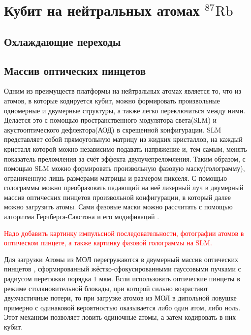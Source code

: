 \section{Кубит на нейтральных атомах $^{87}\text{Rb}$}
\label{sec:chapter_2}

\subsection{Охлаждающие переходы}


\subsection{Массив оптических пинцетов}

Одним из преимуществ платформы на нейтральных атомах является то, что из атомов, в которые кодируется кубит, можно формировать произвольные одномерные и двумерные структуры, а также легко переключаться между ними. Делается это с помощью пространственного модулятора света(SLM) и акустооптического дефлектора(АОД) в скрещенной конфигурации. SLM представляет собой прямоугольную матрицу из жидких кристаллов, на каждый кристалл которой можно независимо подавать напряжение и, тем самым, менять показатель преломления за счёт эффекта двулучепреломления. Таким образом, с помощью SLM можно формировать произвольную фазовую маску(голограмму), ограниченную лишь размерами матрицы и размером пикселя. С помощью голограммы можно преобразовать падающий на неё лазерный луч в двумерный массив оптических пинцетов произвольной конфигурации, в который далее можно загрузить атомы. Сами фазовые маски можно рассчитать с помощью алгоритма Герчберга-Сакстона \cite{Gerchberg1972APA} и его модификаций \cite{robust_masks,Zupancic:16}.

\textcolor{red}{Надо добавить картинку импульсной последовательности, фотографии атомов в оптическом пинцете, а также картинку фазовой голограммы на SLM.}

Для загрузки Атомы из МОЛ перегружаются в двумерный массив оптических пинцетов \cite{Ashkin:99}, сформированный жёстко-сфокусированными гауссовыми пучками с радиусом перетяжки порядка $1 \text{ мкм}$. Если использовать оптические пинцеты в режиме столкновительной блокады\cite{Schlosser_Grangier,Kuppens_Wieman}, при которой сильно возрастают двухчастичные потери, то при загрузке атомов из МОЛ в дипольной ловушке примерно с одинаковой вероятностью оказывается либо один атом, либо ноль. Этот механизм позволяет ловить одиночные атомы, а затем кодировать в них кубит. 



